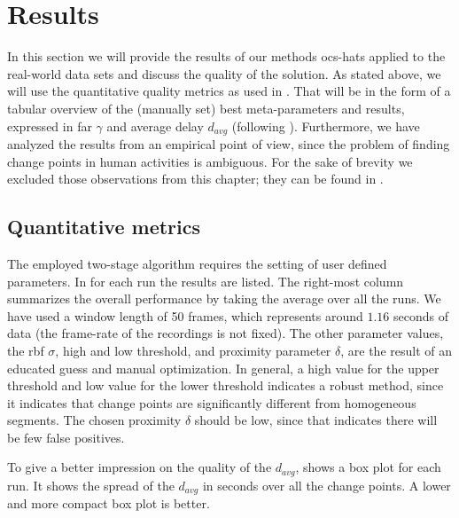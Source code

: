 \section{Results}\label{sec:real_world_results}
In this section we will provide the results of our methods \gls{ocs-hats} applied to the real-world data sets and discuss the quality of the solution.
As stated above, we will use the quantitative quality metrics as used in .
That will be in the form of a tabular overview of the (manually set) best meta-parameters and results, expressed in \gls{far} $\gamma$ and average delay $d_{avg}$ (following ).
Furthermore, we have analyzed the results from an empirical point of view, since the problem of finding change points in human activities is ambiguous.
For the sake of brevity we excluded those observations from this chapter; they can be found in .

\subsection{Quantitative metrics}
The employed two-stage algorithm requires the setting of user defined parameters.
In  for each run the results are listed.
The right-most column summarizes the overall performance by taking the average over all the runs.
We have used a window length of 50 frames, which represents around $1.16$ seconds of data (the frame-rate of the recordings is not fixed).
The other parameter values, \ie the \gls{rbf} $\sigma$, high and low threshold, and proximity parameter $\delta$, are the result of an educated guess and manual optimization.
In general, a high value for the upper threshold and low value for the lower threshold indicates a robust method, since it indicates that change points are significantly different from homogeneous segments.
The chosen proximity $\delta$ should be low, since that indicates there will be few false positives.

To give a better impression on the quality of the $d_{avg}$,  shows a box plot for each run.
It shows the spread of the $d_{avg}$ in seconds over all the change points.
A lower and more compact box plot is better.

